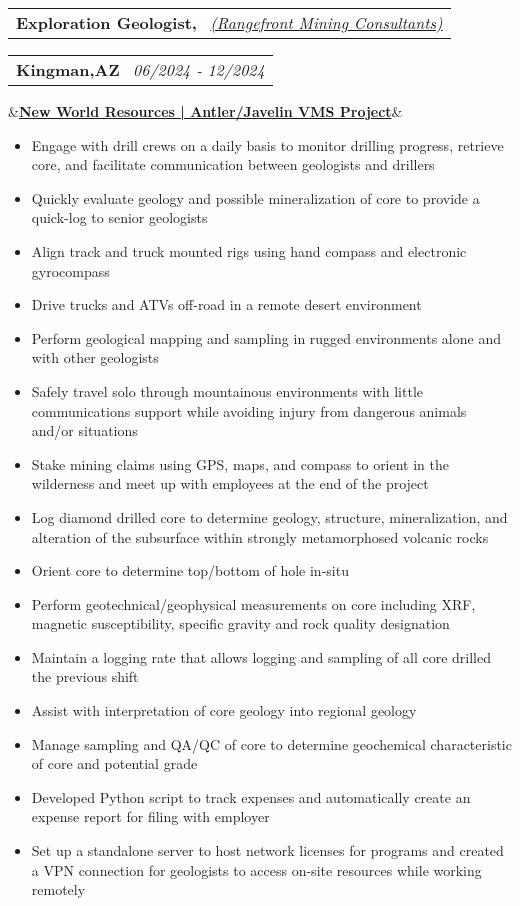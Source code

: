 \documentclass[12pt,a4paper,sans]{moderncv}
\makeatletter
\newcommand*{\customcventry}[7][.13em]{
\begin{tabular}{@{}l}
{\bfseries #4} \
{\itshape #3}
\end{tabular}
\hfill
\begin{tabular}{l@{}}
{\bfseries #5} \
{\itshape #2}
\end{tabular}
\ifx&#7&%
\else{\
\begin{minipage}{\maincolumnwidth}%
\small#7%
\end{minipage}}\fi%
\par\addvspace{#1}}
\makeatother
\begin{document}
\customcventry{06/2024 ‐ 12/2024}{{\color{blue}\href{https://www.rangefront.com/}{(Rangefront Mining Consultants)}}}{Exploration Geologist,}{Kingman,AZ}{}{\color{blue}\href{https://newworldres.com/projects/antler-copper-project-arizona-usa/}{\textbf{New World Resources | Antler/Javelin VMS Project}}}
\vspace{-1mm}
{\begin{itemize}[noitemsep, leftmargin=0.6cm, label={\textbullet}]
\item Engage with drill crews on a daily basis to monitor drilling progress, retrieve core, and facilitate communication between geologists and drillers
\item Quickly evaluate geology and possible mineralization of core to provide a quick-log to senior geologists
\item Align track and truck mounted rigs using hand compass and electronic gyrocompass
\item Drive trucks and ATVs off-road in a remote desert environment
\item Perform geological mapping and sampling in rugged environments alone and with other geologists
\item Safely travel solo through mountainous environments with little communications support while avoiding injury from dangerous animals and/or situations
\item Stake mining claims using GPS, maps, and compass to orient in the wilderness and meet up with employees at the end of the project
\item Log diamond drilled core to determine geology, structure, mineralization, and alteration of the subsurface within strongly metamorphosed volcanic rocks
\item Orient core to determine top/bottom of hole in-situ
\item Perform geotechnical/geophysical measurements on core including XRF, magnetic susceptibility, specific gravity and rock quality designation
\item Maintain a logging rate that allows logging and sampling of all core drilled the previous shift
\item Assist with interpretation of core geology into regional geology
\item Manage sampling and QA/QC of core to determine geochemical characteristic of core and potential grade
\item Developed Python script to track expenses and automatically create an expense report for filing with employer
\item Set up a standalone server to host network licenses for programs and created a VPN connection for geologists to access on-site resources while working remotely

\end{itemize}}
\end{document}
